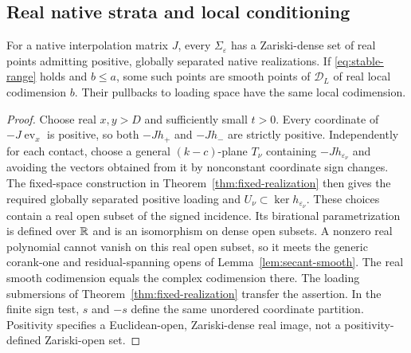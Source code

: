 \subsection{Real native strata and local conditioning}
\begin{corollary}\label{cor:signed-native}
For a native interpolation matrix $J$, every $\Sigma_\varepsilon$ has a Zariski-dense set of real points admitting positive, globally separated native realizations. If \eqref{eq:stable-range} holds and $b\le a$, some such points are smooth points of $\mathscr D_L$ of real local codimension $b$. Their pullbacks to loading space have the same local codimension.
\end{corollary}
\begin{proof}
Choose real $x,y>D$ and sufficiently small $t>0$. Every coordinate of $-J\operatorname{ev}_x$ is positive, so both $-Jh_+$ and $-Jh_-$ are strictly positive. Independently for each contact, choose a general $(k-c)$-plane $T_\nu$ containing $-Jh_{\varepsilon_\nu}$ and avoiding the vectors obtained from it by nonconstant coordinate sign changes. The fixed-space construction in Theorem~\ref{thm:fixed-realization} then gives the required globally separated positive loading and $U_\nu\subset\ker h_{\varepsilon_\nu}$. These choices contain a real open subset of the signed incidence. Its birational parametrization is defined over $\mathbb R$ and is an isomorphism on dense open subsets. A nonzero real polynomial cannot vanish on this real open subset, so it meets the generic corank-one and residual-spanning opens of Lemma~\ref{lem:secant-smooth}. The real smooth codimension equals the complex codimension there. The loading submersions of Theorem~\ref{thm:fixed-realization} transfer the assertion. In the finite sign test, $s$ and $-s$ define the same unordered coordinate partition. Positivity specifies a Euclidean-open, Zariski-dense real image, not a positivity-defined Zariski-open set.
\end{proof}

